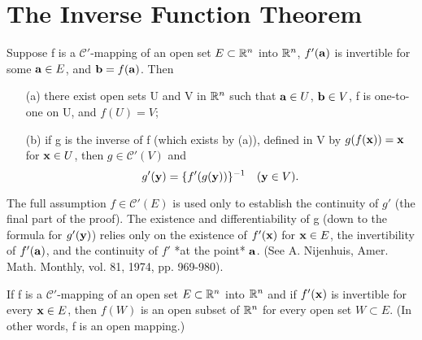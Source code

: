 \section{The Inverse Function Theorem}

\begin{theorem}
  \label{thm:chap9:inverse_function_thm}
  Suppose f is a $\mathcal{C}'$-mapping of an open set $E \subset
  \mathbb{R}^n$ into $\mathbb{R}^n$, $f'(\mathbf{a})$ is invertible for some $\mathbf{a}
  \in E$, and $\mathbf{b} = f(\mathbf{a})$. Then
  \begin{enumerate}
    \item[(a)] there exist open sets U and V in $\mathbb{R}^n$ such that
      $\mathbf{a} \in U$, $\mathbf{b} \in V$, f is one-to-one on U, and $f(U) = V$;
    \item[(b)] if g is the inverse of f (which exists by (a)),
      defined in V by $g(f(\mathbf{x})) = \mathbf{x}$ for $\mathbf{x} \in
      U$, then $g \in \mathcal{C}'(V)$ and
      \begin{equation*} %
        g'(\vect{y}) = \{ f'(g(\vect{y})) \}^{-1} \quad (\vect{y} \in V).
      \end{equation*}
  \end{enumerate}
\end{theorem}

\begin{remark}
  \label{rem:chap9:ift_proof_remark}
  The full assumption $f \in \mathcal{C}'(E)$ is used only to
  establish the continuity of $g'$ (the final part of the proof). The
  existence and differentiability of g (down to the formula for
  $g'(\mathbf{y})$) relies only on the existence of $f'(\mathbf{x})$ for
  $\mathbf{x} \in E$, the invertibility of $f'(\mathbf{a})$, and the
  continuity of $f'$ *at the point* $\mathbf{a}$. (See A. Nijenhuis,
  Amer. Math. Monthly, vol. 81, 1974, pp. 969-980).
\end{remark}


\begin{theorem}
  \label{thm:chap9:open_mapping_thm}
  If f is a $\mathcal{C}'$-mapping of an open set $E \subset \mathbb{R}^n$
  into $\mathbb{R}^n$ and if $f'(\mathbf{x})$ is invertible for every $\mathbf{x}
  \in E$, then $f(W)$ is an open subset of $\mathbb{R}^n$ for every open set
  $W \subset E$. (In other words, f is an open mapping.)
\end{theorem}

